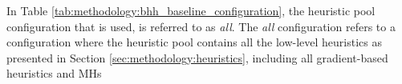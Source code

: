 \begin{table}[htb]
	\centering
	\caption{The \acs{BHH} baseline configuration as it is used in the empirical study.}
	\label{tab:methodology:bhh_baseline_configuration}%
	\par\bigskip
\end{table}%

In Table \ref{tab:methodology:bhh_baseline_configuration}, the heuristic pool configuration that is used, is referred to as \textit{all}. The \textit{all} configuration refers to a configuration where the heuristic pool contains all the low-level heuristics as presented in Section \ref{sec:methodology:heuristics}, including all gradient-based heuristics and \acp{MH}

